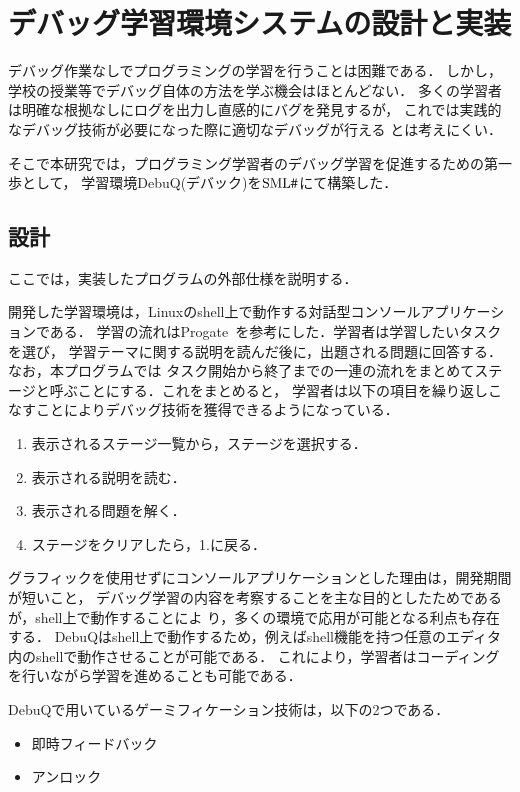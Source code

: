 \documentclass{jreport}
\newcommand\SMLSharp{$\mbox{SML\fontfamily{ptm}\selectfont\#}$}
\begin{document}
\chapter{デバッグ学習環境システムの設計と実装}
\label{ch:implement}
デバッグ作業なしでプログラミングの学習を行うことは困難である．
しかし，学校の授業等でデバッグ自体の方法を学ぶ機会はほとんどない．
多くの学習者は明確な根拠なしにログを出力し直感的にバグを発見するが，
これでは実践的なデバッグ技術が必要になった際に適切なデバッグが行える
とは考えにくい．

そこで本研究では，プログラミング学習者のデバッグ学習を促進するための第一歩として，
学習環境DebuQ(デバック)を\SMLSharp にて構築した．

\section{設計}
ここでは，実装したプログラムの外部仕様を説明する．

開発した学習環境は，Linuxのshell上で動作する対話型コンソールアプリケーションである．
学習の流れはProgate~\cite{Progate}を参考にした．学習者は学習したいタスクを選び，
学習テーマに関する説明を読んだ後に，出題される問題に回答する．なお，本プログラムでは
タスク開始から終了までの一連の流れをまとめてステージと呼ぶことにする．これをまとめると，
学習者は以下の項目を繰り返しこなすことによりデバッグ技術を獲得できるようになっている．

\begin{enumerate}
  \item 表示されるステージ一覧から，ステージを選択する．
  \item 表示される説明を読む．
  \item 表示される問題を解く．
  \item ステージをクリアしたら，1.に戻る．
\end{enumerate}

グラフィックを使用せずにコンソールアプリケーションとした理由は，開発期間が短いこと，
デバッグ学習の内容を考察することを主な目的としたためであるが，shell上で動作することによ
り，多くの環境で応用が可能となる利点も存在する．
DebuQはshell上で動作するため，例えばshell機能を持つ任意のエディタ内のshellで動作させることが可能である．
これにより，学習者はコーディングを行いながら学習を進めることも可能である．

DebuQで用いているゲーミフィケーション技術は，以下の2つである．

\begin{itemize}
  \item 即時フィードバック
  \item アンロック
\end{itemize}
\end{document}
